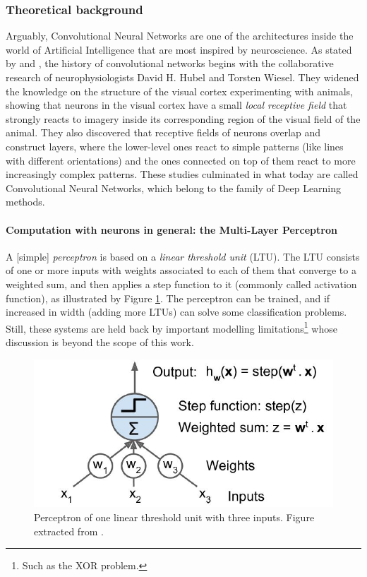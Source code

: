 \documentclass[../main.tex]{subfiles}
\begin{document}
\subsubsection{Theoretical background} \label{sec:theory_neural_networks}
Arguably, Convolutional Neural Networks are one of the architectures inside the world of Artificial Intelligence that are most inspired by neuroscience. 
As stated by \cite{deep_learning_IGoodfellow} and \cite{hands_on_ML_Aurelien}, the history of convolutional networks begins with the collaborative research of neurophysiologists David H. Hubel and Torsten Wiesel. They widened the knowledge on the structure of the visual cortex experimenting with animals, showing that neurons in the visual cortex have a small \textit{local receptive field} that strongly reacts to imagery inside its corresponding region of the visual field of the animal. They also discovered that receptive fields of neurons overlap and construct layers, where the lower-level ones react to simple patterns (like lines with different orientations) and the ones connected on top of them react to more increasingly complex patterns. These studies culminated in what today are called Convolutional Neural Networks, which belong to the family of Deep Learning methods.

\paragraph{Computation with neurons in general: the Multi-Layer Perceptron}
A [simple] \textit{perceptron} is based on a \textit{linear threshold unit} (LTU). The LTU consists of one or more inputs with weights associated to each of them that converge to a weighted sum, and then applies a step function to it (commonly called activation function), as illustrated by Figure \ref{fig:simple_LTU}. The perceptron can be trained, and if increased in width (adding more LTUs) can solve some classification problems. Still, these systems are held back by important modelling limitations\footnote{Such as the XOR problem.} whose discussion is beyond the scope of this work.

\begin{figure}[H]
    \centering
    \includegraphics[width=0.7\linewidth]{images/simple_LTU.JPG}
    \caption{Perceptron of one linear threshold unit with three inputs. Figure extracted from \cite{hands_on_ML_Aurelien}.}
    \label{fig:simple_LTU}
\end{figure}
\end{document}
